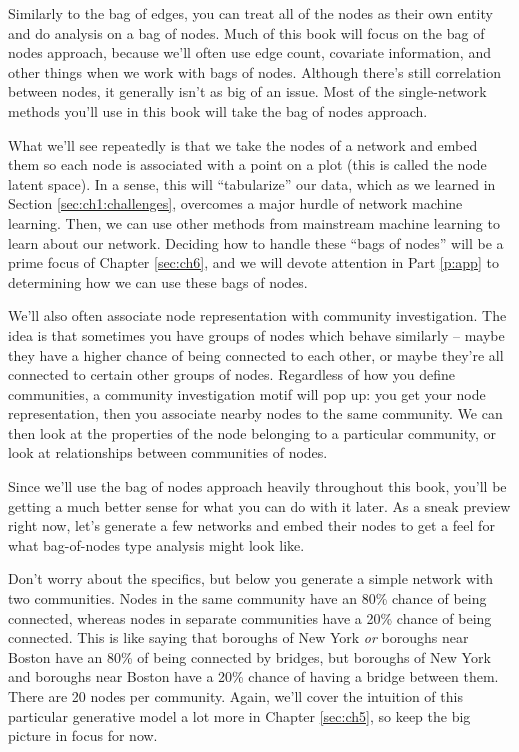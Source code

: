 Similarly to the bag of edges, you can treat all of the nodes as their own entity and do analysis on a bag of nodes. Much of this book will focus on the bag of nodes approach, because we'll often use edge count, covariate information, and other things when we work with bags of nodes. Although there's still correlation between nodes, it generally isn't as big of an issue. Most of the single-network methods you'll use in this book will take the bag of nodes approach. 

What we'll see repeatedly is that we take the nodes of a network and {embed} them so each node is associated with a point on a plot (this is called the {node latent space}). In a sense, this will ``tabularize'' our data, which as we learned in Section \ref{sec:ch1:challenges}, overcomes a major hurdle of network machine learning. Then, we can use other methods from mainstream machine learning to learn about our network. Deciding how to handle these ``bags of nodes'' will be a prime focus of Chapter \ref{sec:ch6}, and we will devote attention in Part \ref{p:app} to determining how we can use these bags of nodes.

We'll also often associate node representation with community investigation. The idea is that sometimes you have groups of nodes which behave similarly -- maybe they have a higher chance of being connected to each other, or maybe they're all connected to certain other groups of nodes. Regardless of how you define communities, a community investigation motif will pop up: you get your node representation, then you associate nearby nodes to the same community. We can then look at the properties of the node belonging to a particular community, or look at relationships between communities of nodes.

Since we'll use the bag of nodes approach heavily throughout this book, you'll be getting a much better sense for what you can do with it later. As a sneak preview right now, let's generate a few networks and embed their nodes to get a feel for what bag-of-nodes type analysis might look like. 

Don't worry about the specifics, but below you generate a simple network with two communities. Nodes in the same community have an 80\% chance of being connected, whereas nodes in separate communities have a 20\% chance of being connected. This is like saying that boroughs of New York \textit{or} boroughs near Boston have an 80\% of being connected by bridges, but boroughs of New York and boroughs near Boston have a 20\% chance of having a bridge between them. There are 20 nodes per community. Again, we'll cover the intuition of this particular generative model a lot more in Chapter \ref{sec:ch5}, so keep the big picture in focus for now.

